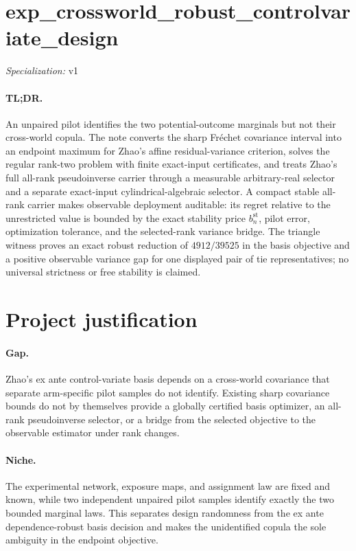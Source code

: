 \documentclass{article}
\begin{document}
\sloppy

\section*{exp\_\allowbreak{}crossworld\_\allowbreak{}robust\_\allowbreak{}controlvariate\_\allowbreak{}design}

\noindent\textit{Specialization:} v1\par

\paragraph{TL;DR.} An unpaired pilot identifies the two potential-outcome marginals but not their cross-world copula.  The note converts the sharp Fr\'echet covariance interval into an endpoint maximum for Zhao's affine residual-variance criterion, solves the regular rank-two problem with finite exact-input certificates, and treats Zhao's full all-rank pseudoinverse carrier through a measurable arbitrary-real selector and a separate exact-input cylindrical-algebraic selector.  A compact stable all-rank carrier makes observable deployment auditable: its regret relative to the unrestricted value is bounded by the exact stability price \(b_n^{\mathrm{st}}\), pilot error, optimization tolerance, and the selected-rank variance bridge.  The triangle witness proves an exact robust reduction of \(4912/39525\) in the basis objective and a positive observable variance gap for one displayed pair of tie representatives; no universal strictness or free stability is claimed.

\section{Project justification}

\paragraph{Gap.} Zhao's ex ante control-variate basis depends on a cross-world covariance that separate arm-specific pilot samples do not identify.  Existing sharp covariance bounds do not by themselves provide a globally certified basis optimizer, an all-rank pseudoinverse selector, or a bridge from the selected objective to the observable estimator under rank changes.

\paragraph{Niche.} The experimental network, exposure maps, and assignment law are fixed and known, while two independent unpaired pilot samples identify exactly the two bounded marginal laws.  This separates design randomness from the ex ante dependence-robust basis decision and makes the unidentified copula the sole ambiguity in the endpoint objective.
\end{document}
